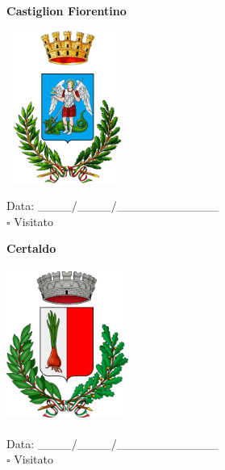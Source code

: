 \documentclass[a5paper,12pt]{article}
\begin{document}
\vspace{0.7cm}

\noindent
\begin{minipage}[t]{0.45\textwidth}
    \begin{center}
        \textbf{Castiglion Fiorentino}
    \end{center}
    \vspace{-0.5cm} %
    \begin{center}
        \includegraphics[height= 5cm, width=4cm]{Toscana/Stemma Castiglion Fiorentino.png}
    \end{center}
    \vspace{-0.4cm} %
    \begin{flushleft}
        Data: \_\_\_\_/\_\_\_\_/\_\_\_\_\_\_\_\_\_\_\_\_ \\
        $\square$ Visitato
    \end{flushleft}
\end{minipage}
\hfill
\noindent
\begin{minipage}[t]{0.45\textwidth}
    \begin{center}
        \textbf{Certaldo}
    \end{center}
    \vspace{-0.5cm} %
    \begin{center}
        \includegraphics[height= 5cm, width=4cm]{Toscana/Stemma Certaldo.png}
    \end{center}
    \vspace{-0.4cm} %
    \begin{flushleft}
        Data: \_\_\_\_/\_\_\_\_/\_\_\_\_\_\_\_\_\_\_\_\_ \\
        $\square$ Visitato
    \end{flushleft}
\end{minipage}
\end{document}
